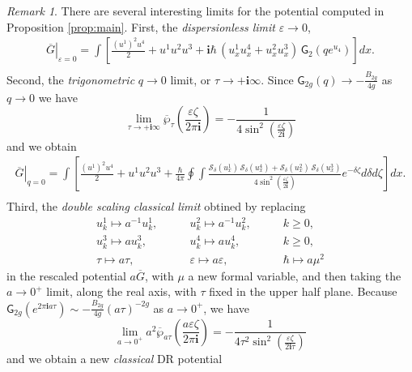 \documentclass{amsart}
\numberwithin{equation}{section} %
\theoremstyle{plain}
\theoremstyle{remark}
\newtheorem{remark}[theorem]{Remark}
\def\cxi{\mathbf{i}}
\begin{document}
\begin{remark}
There are several interesting limits for the potential computed in Proposition \ref{prop:main}. First, the \emph{dispersionless limit} $\varepsilon \to 0$,
\begin{align*}
\left.\overline{G}\right|_{\varepsilon=0} = \int \left[ \frac{(u^1)^2 u^4}{2} + u^1 u^2 u^3 + \cxi \hbar\,  (u^1_x u^4_x +  u^2_x u^3_x)\, \mathsf{G}_{2} \left( q e^{u_4}\right)\right]dx.\\
\end{align*}
Second, the \emph{trigonometric} $q \to 0$ limit, or $\tau \to +\cxi \infty$. Since $\mathsf{G}_{2g}(q) \to -\frac{B_{2g}}{4g}$ as $q\to 0$ we have
$$\lim_{\tau \to +\cxi \infty} \overline{\wp}_{\tau}\left(\frac{\varepsilon \zeta}{2 \pi \cxi}\right) =-\frac{1} {4 \sin^2\left(\frac{\varepsilon \zeta}{2\cxi}\right)}$$
and we obtain
\begin{align*}
\left.\overline{G}\right|_{q=0} = \int \left[ \frac{(u^1)^2 u^4}{2} + u^1 u^2 u^3 + \frac{\hbar}{4\pi} %
\oint\!\!\int
\frac{\mathcal{S}_{\delta} ( u^1_x) \,\mathcal{S}_{\delta}( u^4_x) +\mathcal{S}_{\delta}( u^2_x)\,\mathcal{S}_{\delta}( u^3_x)}{4 \sin^2\left(\frac{\varepsilon \zeta}{2\cxi}\right)} e^{-\delta\zeta}	d\delta d\zeta \right]dx.\\
\end{align*}
Third, the \emph{double scaling classical limit} obtined by replacing
\begin{equation}\label{eq:dsl}
\begin{array}{lll}
u^1_k \mapsto a^{-1} u^1_k, \qquad &  u^2_k \mapsto a^{-1} u^2_k, \qquad& k\geq 0,\\
u^3_k \mapsto a u^3_k, \qquad &  u^4_k \mapsto a u^4_k, \qquad &k\geq 0,\\
\tau \mapsto a \tau, \qquad & \varepsilon \mapsto a \varepsilon, \qquad & \hbar \mapsto a \mu^2
\end{array}
\end{equation}
in the rescaled potential $a \overline{G}$, with $\mu$ a new formal variable, and then taking the $a \to 0^+$ limit, along the real axis, with $\tau$ fixed in the upper half plane. Because $\mathsf{G}_{2g}(e^{2\pi \cxi a \tau}) \sim -\frac{B_{2g}}{4g}(a\tau)^{-2g}$ as $a\to 0^+$, we have
$$\lim_{a \to 0^+} a^2 \overline{\wp}_{a \tau}\left(\frac{a \varepsilon \zeta}{2 \pi \cxi}\right) =-\frac{1} {4 \tau^2 \sin^2\left(\frac{\varepsilon \zeta}{2\cxi \tau}\right)}$$
and we obtain a new \emph{classical} DR potential
\begin{align*}

\end{align*}
\end{remark}
\end{document}
